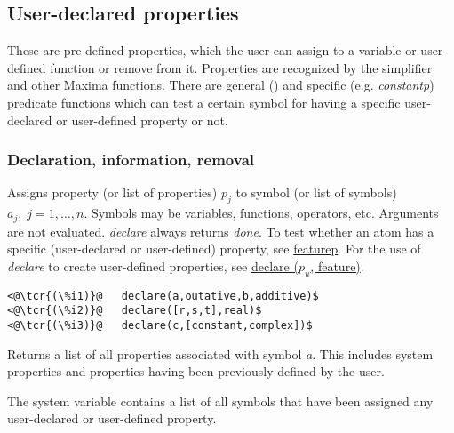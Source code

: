 \documentclass[../Maxima_Workbook.tex]{subfiles}
\begin{document}
\subsection{User-declared properties}\label{Db3}

These are pre-defined properties, which the user can assign to a variable or user-defined function or remove from it. Properties are recognized by the simplifier and other Maxima functions. There are general () and specific (e.g. \emph{constantp}) predicate functions which can test a certain symbol for having a specific user-declared or user-defined property or not. 

\subsubsection{Declaration, information, removal}

\lz {}

\hfill \tcr{[function]}

\lz Assigns property (or list of properties) $ p_j $ to symbol (or list of symbols) $ a_j, \; j=1,\dots,n $. Symbols may be variables, functions, operators, etc. Arguments are not evaluated. \emph{declare} always returns \emph{done}. To test whether an atom has a specific (user-declared or user-defined) property, see \hyperlink{featurep}{featurep}. For the use of \emph{declare} to create user-defined properties, see \hyperlink{declare-feature}{declare ($ p_u $, feature)}.

\lz \begin{lstlisting}
<@\tcr{(\%i1)}@   declare(a,outative,b,additive)$
<@\tcr{(\%i2)}@   declare([r,s,t],real)$
<@\tcr{(\%i3)}@   declare(c,[constant,complex])$
\end{lstlisting}

\lz {} \hfill \tcr{[function]}

\lz Returns a list of all properties associated with symbol \emph{a}. This includes system properties and properties having been previously defined by the user.

\lzz {} \hfill {}

\lz The system variable contains a list of all symbols that have been assigned any user-declared or user-defined property.
\end{document}
